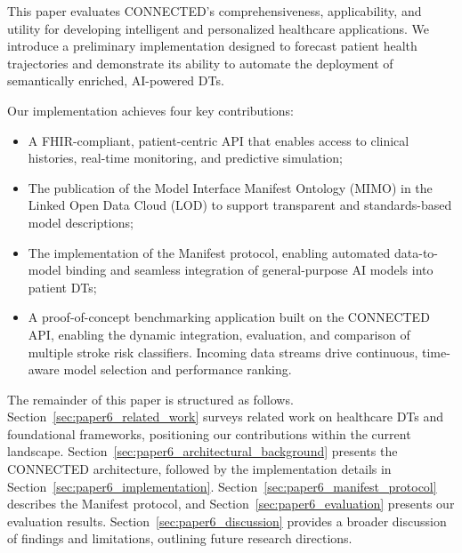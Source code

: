 This paper evaluates CONNECTED's comprehensiveness, applicability, and utility for developing intelligent and personalized healthcare applications. We introduce a preliminary implementation designed to forecast patient health trajectories and demonstrate its ability to automate the deployment of semantically enriched, AI-powered DTs. 

Our implementation achieves four key contributions:
\begin{itemize}
    \item A FHIR-compliant, patient-centric API that enables access to clinical histories, real-time monitoring, and predictive simulation;
    \item The publication of the Model Interface Manifest Ontology (MIMO) in the Linked Open Data Cloud (LOD) to support transparent and standards-based model descriptions;
    \item The implementation of the Manifest protocol, enabling automated data-to-model binding and seamless integration of general-purpose AI models into patient DTs;
    \item A proof-of-concept benchmarking application built on the CONNECTED API, enabling the dynamic integration, evaluation, and comparison of multiple stroke risk classifiers. Incoming data streams drive continuous, time-aware model selection and performance ranking.
\end{itemize}
The remainder of this paper is structured as follows. Section~\ref{sec:paper6_related_work} surveys related work on healthcare DTs and foundational frameworks, positioning our contributions within the current landscape. Section~\ref{sec:paper6_architectural_background} presents the CONNECTED architecture, followed by the implementation details in Section~\ref{sec:paper6_implementation}. Section~\ref{sec:paper6_manifest_protocol} describes the Manifest protocol, and Section~\ref{sec:paper6_evaluation} presents our evaluation results. Section~\ref{sec:paper6_discussion} provides a broader discussion of findings and limitations, outlining future research directions.


